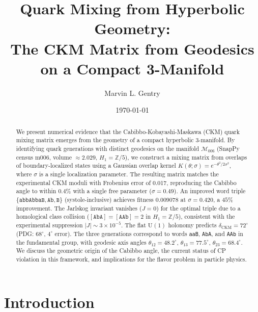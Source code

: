 \documentclass[11pt,a4paper]{article}
\newcommand{\Msix}{\mathcal{M}_{006}}
\begin{document}
\title{Quark Mixing from Hyperbolic Geometry:\\
The CKM Matrix from Geodesics on a Compact 3-Manifold}

\author[1]{Marvin L. Gentry}
\date{\today}


\begin{abstract}
We present numerical evidence that the Cabibbo-Kobayashi-Maskawa (CKM)
quark mixing matrix emerges from the geometry of a compact hyperbolic
3-manifold. By identifying quark generations with distinct geodesics
on the manifold $\Msix$ (SnapPy census m006, volume $\approx 2.029$,
$H_1 = \mathbb{Z}/5$), we construct a mixing matrix from overlaps of
boundary-localized states using a Gaussian overlap kernel
$K(\theta;\sigma) = e^{-\theta^2/2\sigma^2}$, where $\sigma$
is a single localization parameter. The resulting matrix matches the experimental
CKM moduli with Frobenius error of 0.017, reproducing the Cabibbo angle
to within $0.4\%$ with a single free parameter ($\sigma = 0.49$).
An improved word triple $\{\texttt{abbAbbaB}, \texttt{Ab}, \texttt{B}\}$
(systole-inclusive) achieves fitness $0.009078$ at $\sigma = 0.420$,
a $45\%$ improvement. The Jarlskog invariant vanishes ($J=0$) for the
optimal triple due to a homological class collision
($[\texttt{AbA}]=[\texttt{AAb}]=2$ in $H_1=\mathbb{Z}/5$),
consistent with the experimental suppression $|J|\sim3\times10^{-5}$.
The flat $\mathrm{U}(1)$ holonomy predicts $\delta_{\mathrm{CKM}}=72^\circ$
(PDG: $68^\circ$, $4^\circ$ error). The three
generations correspond to words \texttt{aaB}, \texttt{AbA}, and
\texttt{AAb} in the fundamental group, with geodesic axis angles
$\theta_{12} = 48.2^\circ$, $\theta_{13} = 77.5^\circ$,
$\theta_{23} = 68.4^\circ$. We discuss the geometric origin of the
Cabibbo angle, the current status of CP violation in this framework,
and implications for the flavor problem in particle physics.
\end{abstract}

\maketitle

\section{Introduction}
\label{sec:intro}
\end{document}
